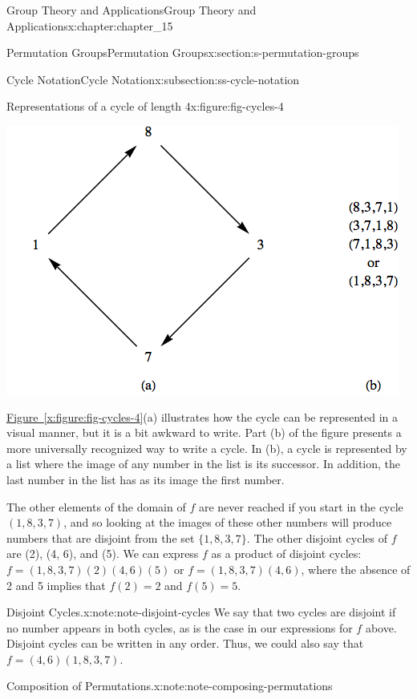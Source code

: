 \documentclass[oneside,10pt,]{book}
\newcommand{\xreffont}{\relax}
\numberwithin{equation}{section}
\begin{document}
\begin{chapterptx}{Group Theory and Applications}{}{Group Theory and Applications}{}{}{x:chapter:chapter_15}
\begin{sectionptx}{Permutation Groups}{}{Permutation Groups}{}{}{x:section:s-permutation-groups}
\begin{subsectionptx}{Cycle Notation}{}{Cycle Notation}{}{}{x:subsection:ss-cycle-notation}
\begin{figureptx}{Representations of a cycle of length 4}{x:figure:fig-cycles-4}{}%
\begin{image}{0.15}{0.7}{0.15}%
\includegraphics[width=\linewidth]{images/fig-cycles-4.png}
\end{image}%
\tcblower
\end{figureptx}%
\hyperref[x:figure:fig-cycles-4]{Figure~{\xreffont\ref{x:figure:fig-cycles-4}}}(a) illustrates how the cycle can be represented in a visual manner, but it is a bit awkward to write. Part (b) of the figure presents a more universally recognized way to write a cycle.  In (b), a cycle is represented by a list where the image of any number in the list is its successor.  In addition, the last number in the list has as its image the first number.%
\par
The other elements of the domain of \(f\) are never reached if you start in the cycle \((1,8,3,7)\), and so looking at the images of these other numbers will produce numbers that are disjoint from the set \(\{1,8,3,7\}\).   The other disjoint cycles of \(f\)  are  (2), (4, 6), and (5).  We can express \(f\) as a product of disjoint cycles: \(f= (1, 8, 3, 7)(2)(4, 6)(5)\) or \(f= (1,8,3,7)(4,6)\), where the absence of 2 and 5 implies that \(f(2) = 2\) and \(f(5) = 5\).%
\begin{note}{Disjoint Cycles.}{x:note:note-disjoint-cycles}%
%
We say that two cycles are disjoint if no number appears in both cycles, as is the case in our expressions for \(f\) above. Disjoint cycles can be written in any order. Thus, we could also say that \(f=(4,6)(1,8,3,7)\).%
\end{note}
\begin{note}{Composition of Permutations.}{x:note:note-composing-permutations}%

\end{note}
\end{subsectionptx}
\end{sectionptx}
\end{chapterptx}
\end{document}

